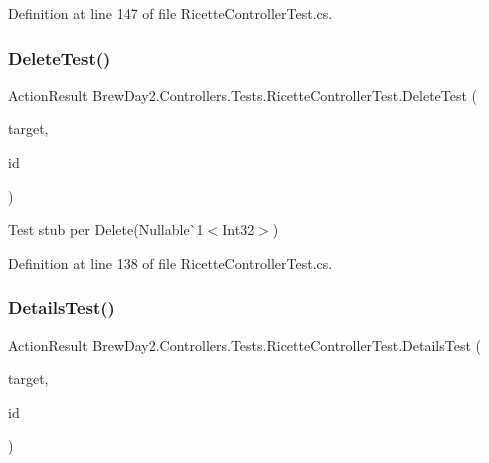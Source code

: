 Definition at line 147 of file Ricette\+Controller\+Test.\+cs.

\mbox{\label{class_brew_day2_1_1_controllers_1_1_tests_1_1_ricette_controller_test_a6fc17d02986a7801435834fa67281782}} 
\subsubsection{\texorpdfstring{Delete\+Test()}{DeleteTest()}}
{\footnotesize\ttfamily Action\+Result Brew\+Day2.\+Controllers.\+Tests.\+Ricette\+Controller\+Test.\+Delete\+Test (\begin{DoxyParamCaption}\item[{\mbox{[}\+Pex\+Assume\+Under\+Test\mbox{]} \mbox{\hyperlink{class_brew_day2_1_1_controllers_1_1_ricette_controller}{Ricette\+Controller}}}]{target,  }\item[{int?}]{id }\end{DoxyParamCaption})}



Test stub per Delete(Nullable\`{}1$<$Int32$>$)



Definition at line 138 of file Ricette\+Controller\+Test.\+cs.

\mbox{\label{class_brew_day2_1_1_controllers_1_1_tests_1_1_ricette_controller_test_a5febace1c04be580e160e9e76ff19dd9}} 
\subsubsection{\texorpdfstring{Details\+Test()}{DetailsTest()}}
{\footnotesize\ttfamily Action\+Result Brew\+Day2.\+Controllers.\+Tests.\+Ricette\+Controller\+Test.\+Details\+Test (\begin{DoxyParamCaption}\item[{\mbox{[}\+Pex\+Assume\+Under\+Test\mbox{]} \mbox{\hyperlink{class_brew_day2_1_1_controllers_1_1_ricette_controller}{Ricette\+Controller}}}]{target,  }\item[{int?}]{id }\end{DoxyParamCaption})}



